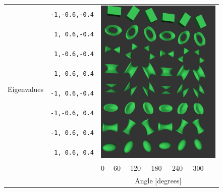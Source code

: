 \documentclass{InsightArticle}
\begin{document}
\renewcommand{\arraystretch}{2.09}
\begin{table}[ht]
  \begin{tabular}{cc p{0.01cm}p{0.4cm}p{0.5cm}p{0.5cm}p{0.5cm}p{0.5cm}p{0.5cm}}
    \hline
    \multirow{9}{*}{Eigenvalues}
    &\texttt{-1,-0.6,-0.4}&\multicolumn{7}{l}{\multirow{8}{*}{\includegraphics[width=6cm]{SignedEigenvalueTensorGlyphMatrix}}} \\
    &\texttt{ 1, 0.6,-0.4}& & & & & & & \\
    &\texttt{ 1,-0.6,-0.4}& & & & & & & \\
    &\texttt{ 1,-0.6, 0.4}& & & & & & & \\
    &\texttt{-1, 0.6,-0.4}& & & & & & & \\
    &\texttt{-1,-0.6, 0.4}& & & & & & & \\
    &\texttt{-1, 0.6, 0.4}& & & & & & & \\
    &\texttt{ 1, 0.6, 0.4}& & & & & & & \\
    \hline
    \multicolumn{2}{c}{}& & 0 & 60 & 120 & 180 & 240 & 300 \\ [-1.1em]
    \multicolumn{2}{c}{}& \multicolumn{7}{c}{Angle [degrees]} \\
    \cline{3-9}
  \end{tabular}
  \label{tab:signed-flavors}
\end{table}
\end{document}
